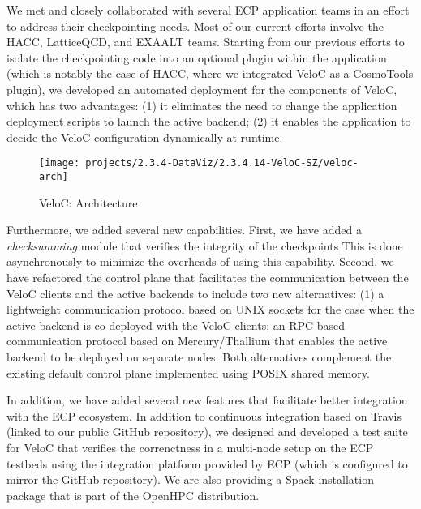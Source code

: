 We met and closely collaborated with several ECP application teams in
an effort to address their checkpointing needs. Most of our current
efforts involve the HACC, LatticeQCD, and EXAALT teams. Starting from
our previous efforts to isolate the checkpointing code into an optional
plugin within the application (which is notably the case of HACC, where
we integrated VeloC as a CosmoTools plugin), we developed an automated
deployment for the components of VeloC, which has two advantages: (1)
it eliminates the need to change the application deployment scripts
to launch the active backend; (2) it enables the application to decide
the VeloC configuration dynamically at runtime.

\begin{wrapfigure}{l}{0.47\textwidth}
  \texttt{[image: projects/2.3.4-DataViz/2.3.4.14-VeloC-SZ/veloc-arch]}
  \caption{VeloC: Architecture}%
  \label{fig:veloc:arch}%
\end{wrapfigure}

Furthermore, we added several new capabilities. First, we have added
a \emph{checksumming} module that verifies the integrity of the checkpoints
This is done asynchronously to minimize the overheads of using this capability.
Second, we have refactored the control plane that facilitates the communication
between the VeloC clients and the active backends to include two new alternatives:
(1) a lightweight communication protocol based on UNIX sockets for the case
when the active backend is co-deployed with the VeloC clients; an RPC-based
communication protocol based on Mercury/Thallium that enables the active
backend to be deployed on separate nodes. Both alternatives complement the
existing default control plane implemented using POSIX shared memory.

In addition, we have added several new features that facilitate better
integration with the ECP ecosystem. In addition to continuous
integration based on Travis (linked to our public GitHub repository),
we designed and developed a test suite for VeloC that verifies the
correnctness in a multi-node setup on the ECP testbeds using the
integration platform provided by ECP (which is configured to
mirror the GitHub repository). We are also providing a Spack
installation package that is part of the OpenHPC distribution.


